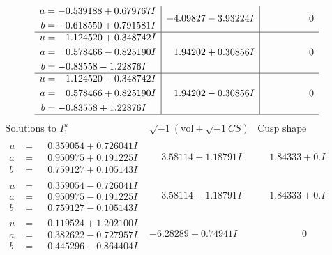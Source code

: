 \documentclass[1p]{elsarticle_modified}
\theoremstyle{definition}
\newcommand{\I}{\sqrt{-1}}
\begin{document}
$$\begin{array}{c|c|c}
\begin{aligned}
a &= -0.539188 + 0.679767 I \\
b &= -0.618550 + 0.791581 I\end{aligned}
 & -4.09827 - 3.93224 I & \phantom{-0.000000 } 0 \\ \hline\begin{aligned}
u &= \phantom{-}1.124520 + 0.348742 I \\
a &= \phantom{-}0.578466 - 0.825190 I \\
b &= -0.83558 - 1.22876 I\end{aligned}
 & \phantom{-}1.94202 + 0.30856 I & \phantom{-0.000000 } 0 \\ \hline\begin{aligned}
u &= \phantom{-}1.124520 - 0.348742 I \\
a &= \phantom{-}0.578466 + 0.825190 I \\
b &= -0.83558 + 1.22876 I\end{aligned}
 & \phantom{-}1.94202 - 0.30856 I & \phantom{-0.000000 } 0\\
 \hline 
 \end{array}$$\newpage$$\begin{array}{c|c|c}  
\text{Solutions to }I^u_{1}& \I (\text{vol} + \sqrt{-1}CS) & \text{Cusp shape}\\
 \hline 
\begin{aligned}
u &= \phantom{-}0.359054 + 0.726041 I \\
a &= \phantom{-}0.950975 + 0.191225 I \\
b &= \phantom{-}0.759127 + 0.105143 I\end{aligned}
 & \phantom{-}3.58114 + 1.18791 I & \phantom{-}1.84333 + 0. I\phantom{ +0.000000I} \\ \hline\begin{aligned}
u &= \phantom{-}0.359054 - 0.726041 I \\
a &= \phantom{-}0.950975 - 0.191225 I \\
b &= \phantom{-}0.759127 - 0.105143 I\end{aligned}
 & \phantom{-}3.58114 - 1.18791 I & \phantom{-}1.84333 + 0. I\phantom{ +0.000000I} \\ \hline\begin{aligned}
u &= \phantom{-}0.119524 + 1.202100 I \\
a &= \phantom{-}0.382622 - 0.727957 I \\
b &= \phantom{-}0.445296 - 0.864404 I\end{aligned}
 & -6.28289 + 0.74941 I & \phantom{-0.000000 } 0 \\ \hline\begin{aligned}

\end{aligned}
\end{array}$$
\end{document}
